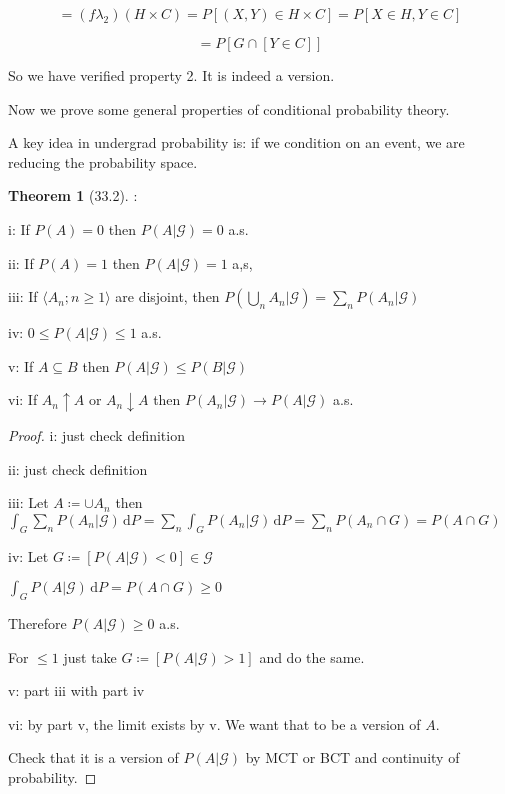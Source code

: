 \documentclass{article}
\theoremstyle{definition}
\newtheorem{theorem}{Theorem}
\begin{document}
\[
    = (f \lambda _2)(H\times C) = P[(X,Y)\in H\times C] = P[X\in H, Y\in C]
\]

\[
    = P[G\cap [Y\in C]]
\]

So we have verified property 2. It is indeed a version.

Now we prove some general properties of conditional probability theory.

A key idea in undergrad probability is: if we condition on an event, we are reducing the probability space.

\begin{theorem}
    [33.2]:

    i: If \(P(A)=0\) then \(P(A|\mathscr{G})=0\) a.s.

    ii: If \(P(A)=1\) then \(P(A|\mathscr{G})=1\) a,s,
    
    iii: If \(\langle A_n; n\geq 1 \rangle \) are disjoint, then \(P(\bigcup_{n}^{} A_n | \mathscr{G})=\sum_{n} P(A_n|\mathscr{G})\) 

    iv: \(0 \leq P(A|\mathscr{G}) \leq 1\) a.s.

    v: If \(A \subseteq B\) then \(P(A|\mathscr{G}) \leq P(B|\mathscr{G})\) 

    vi: If \(A_n\uparrow A\) or \(A_n\downarrow A\) then \(P(A_n|\mathscr{G}) \to P(A|\mathscr{G})\) a.s.
\end{theorem}

\begin{proof}
    i: just check definition

    ii: just check definition

    iii: Let \(A\coloneqq \cup A_n\) then \(\int_{G}^{} \sum_{n} P(A_n|\mathscr{G}) \,\mathrm{d}P = \sum_{n} \int_{G}^{} P(A_n|\mathscr{G}) \,\mathrm{d}P = \sum_{n} P(A_n\cap G) = P(A\cap G)\) 

    iv: Let \(G\coloneqq [P(A|\mathscr{G}) < 0]\in \mathscr{G}\)
    
    \(\int_{G}^{} P(A|\mathscr{G}) \,\mathrm{d}P = P(A\cap G)\geq 0 \) 

    Therefore \(P(A|\mathscr{G})\geq 0\) a.s.

    For \(\leq 1\) just take \(G\coloneqq [P(A|\mathscr{G})>1]\) and do the same.

    v: part iii with part iv

    vi: by part v, the limit exists by v. We want that to be a version of \(A\).

    Check that it is a version of \(P(A|\mathscr{G})\) by MCT or BCT and continuity of probability.

\end{proof}
\end{document}
